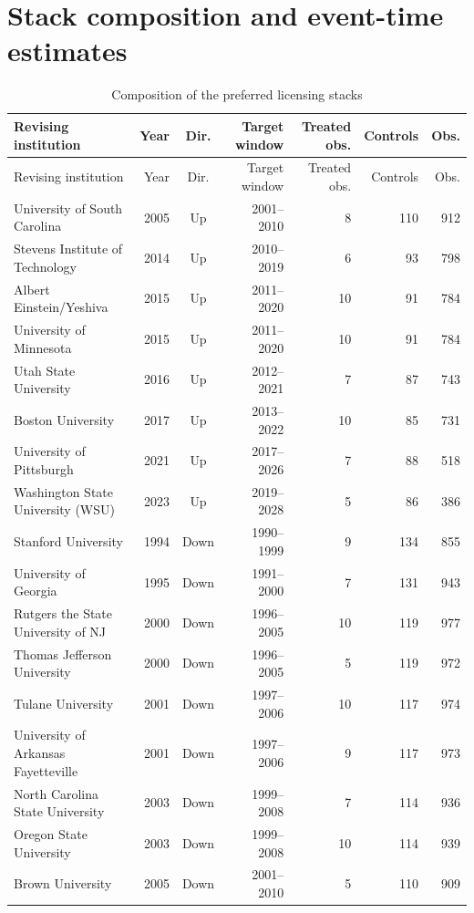 \section{Stack composition and event-time estimates}\label{app:stacks}

{\scriptsize
\begin{longtable}{p{5.8cm}rcrrrr}
\caption{Composition of the preferred licensing stacks}\label{tab:stacks}\\
\toprule
Revising institution & Year & Dir. & Target window & Treated obs. & Controls & Obs. \\\midrule
\endfirsthead
\toprule
Revising institution & Year & Dir. & Target window & Treated obs. & Controls & Obs. \\\midrule
\endhead
University of South Carolina & 2005 & Up & 2001--2010 & 8 & 110 & 912 \\
Stevens Institute of Technology & 2014 & Up & 2010--2019 & 6 & 93 & 798 \\
Albert Einstein/Yeshiva & 2015 & Up & 2011--2020 & 10 & 91 & 784 \\
University of Minnesota & 2015 & Up & 2011--2020 & 10 & 91 & 784 \\
Utah State University & 2016 & Up & 2012--2021 & 7 & 87 & 743 \\
Boston University & 2017 & Up & 2013--2022 & 10 & 85 & 731 \\
University of Pittsburgh & 2021 & Up & 2017--2026 & 7 & 88 & 518 \\
Washington State University (WSU) & 2023 & Up & 2019--2028 & 5 & 86 & 386 \\
Stanford University & 1994 & Down & 1990--1999 & 9 & 134 & 855 \\
University of Georgia & 1995 & Down & 1991--2000 & 7 & 131 & 943 \\
Rutgers the State University of NJ & 2000 & Down & 1996--2005 & 10 & 119 & 977 \\
Thomas Jefferson University & 2000 & Down & 1996--2005 & 5 & 119 & 972 \\
Tulane University & 2001 & Down & 1997--2006 & 10 & 117 & 974 \\
University of Arkansas Fayetteville & 2001 & Down & 1997--2006 & 9 & 117 & 973 \\
North Carolina State University & 2003 & Down & 1999--2008 & 7 & 114 & 936 \\
Oregon State University & 2003 & Down & 1999--2008 & 10 & 114 & 939 \\
Brown University & 2005 & Down & 2001--2010 & 5 & 110 & 909 \\

\end{longtable}}
